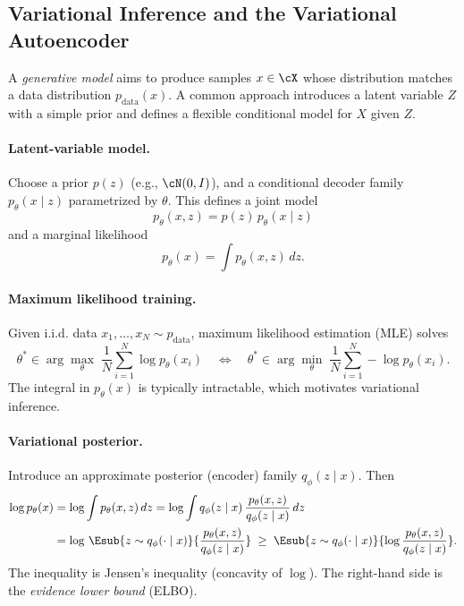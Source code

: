 
\subsection{Variational Inference and the Variational Autoencoder}
\label{sec:vae}

A \emph{generative model} aims to produce samples $x\in\cX$ whose distribution matches a data distribution $p_{\text{data}}(x)$.
A common approach introduces a latent variable $Z$ with a simple prior and defines a flexible conditional model for $X$ given $Z$.

\paragraph{Latent-variable model.}
Choose a prior $p(z)$ (e.g., $\cN(0,I)$), and a conditional decoder family $p_\theta(x\mid z)$ parametrized by $\theta$.
This defines a joint model
\begin{equation}
    p_\theta(x,z)=p(z)\,p_\theta(x\mid z)
\end{equation}
and a marginal likelihood
\begin{equation}
    p_\theta(x)=\int p_\theta(x,z)\,dz.
\end{equation}

\paragraph{Maximum likelihood training.}
Given i.i.d. data $x_1,\dots,x_N\sim p_{\text{data}}$, maximum likelihood estimation (MLE) solves
\begin{equation}
    \theta^* \in \arg\max_{\theta}\; \frac{1}{N}\sum_{i=1}^N \log p_\theta(x_i)
    \quad\Longleftrightarrow\quad
    \theta^* \in \arg\min_{\theta}\; \frac{1}{N}\sum_{i=1}^N -\log p_\theta(x_i).
\end{equation}
The integral in $p_\theta(x)$ is typically intractable, which motivates variational inference.

\paragraph{Variational posterior.}
Introduce an approximate posterior (encoder) family $q_\phi(z\mid x)$.
Then
\begin{equation}
\label{eq:vae-elbo-jensen}
\begin{aligned}
\log p_\theta(x)
&= \log \int p_\theta(x,z)\,dz
= \log \int q_\phi(z\mid x)\,\frac{p_\theta(x,z)}{q_\phi(z\mid x)}\,dz\\
&= \log\, \Esub{z\sim q_\phi(\cdot\mid x)}{\frac{p_\theta(x,z)}{q_\phi(z\mid x)}}
\;\ge\; \Esub{z\sim q_\phi(\cdot\mid x)}{\log\frac{p_\theta(x,z)}{q_\phi(z\mid x)}}.
\end{aligned}
\end{equation}
The inequality is Jensen's inequality (concavity of $\log$).
The right-hand side is the \emph{evidence lower bound} (ELBO).

